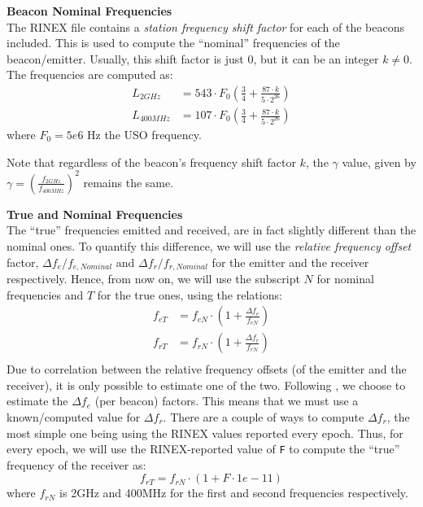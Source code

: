 \textbf{Beacon Nominal Frequencies}\\
\label{beacon-nominal-frequencies}
The RINEX file contains a \emph{station frequency shift factor} for each of the 
beacons included. This is used to compute the ``nominal'' frequencies of the 
beacon/emitter. Usually, this shift factor is just $0$, but it can be an integer 
$k \neq 0$. The frequencies are computed as:
\begin{equation}
  \begin{aligned}
    L_{2GHz}   &= 543 \cdot F_0 \left( \frac{3}{4} + \frac{87\cdot k}{5 \cdot 2^{26}} \right) \\
    L_{400MHz} &= 107 \cdot F_0 \left( \frac{3}{4} + \frac{87\cdot k}{5 \cdot 2^{26}} \right) 
  \end{aligned}
\end{equation}
where $F_0 = 5e6 \text{ Hz}$ the USO frequency.

Note that regardless of the beacon's frequency shift factor $k$, the $\gamma$ 
value, given by $\gamma = \left( \frac{f_{2GHz}}{f_{400MHz}} \right) ^2$ remains 
the same.

\textbf{True and Nominal Frequencies}\\
\label{true-nominal-frequencies}
The ``true'' frequencies emitted and received, are in fact slightly different 
than the nominal ones. To quantify this difference, we will use the 
\emph{relative frequency offset} factor, $\Delta f_e / f_{e,Nominal}$ and 
$\Delta f_r / f_{r,Nominal}$ for the emitter and the receiver respectively. 
Hence, from now on, we will use the subscript $N$ for nominal frequencies and 
$T$ for the true ones, using the relations:
\begin{equation}
  \begin{aligned}
    f_{eT} &= f_{eN} \cdot \left( 1 + \frac{\Delta f_e}{f_{eN}} \right) \\
    f_{rT} &= f_{rN} \cdot \left( 1 + \frac{\Delta f_r}{f_{rN}} \right) \\
  \end{aligned}
\end{equation}
Due to correlation between the relative frequency offsets (of the emitter and 
the receiver), it is only possible to estimate one of the two. Following \cite{lemoine-2016}, 
we choose to estimate the $\Delta f_e$ (per beacon) factors. This means that we 
must use a known/computed value for $\Delta f_r$. {\color{brown}There are a couple 
of ways to compute $\Delta f_r$, the most simple one being using the RINEX values 
reported every epoch.}
Thus, for every epoch, we will use the RINEX-reported value of \texttt{F} to 
compute the ``true'' frequency of the receiver as:
\begin{equation}
  f_{rT} = f_{rN} \cdot \left( 1 + F \cdot 1e-11 \right)
\end{equation}
where $f_{rN}$ is 2GHz and 400MHz for the first and second frequencies 
respectively.

